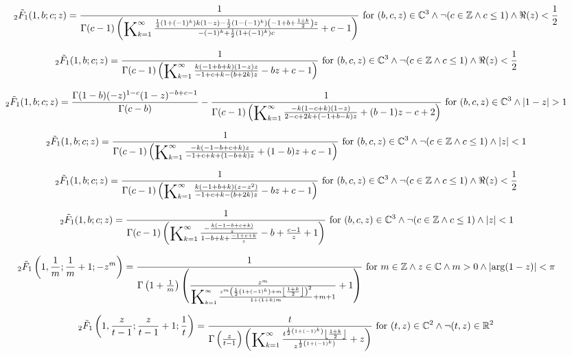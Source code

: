 \documentclass{article}
\newcommand{\bigK}{\mathop{\raisebox{-5pt}{\huge K}}}
\begin{document}
\[\, _2\tilde{F}_1(1,b;c;z)=\frac{1}{\Gamma (c-1) \left(\bigK_{k=1}^{\infty}\frac{\frac{1}{4} \left(1+(-1)^k\right) k (1-z)-\frac{1}{2} \left(1-(-1)^k\right) \left(-1+b+\frac{1+k}{2}\right) z}{-(-1)^k+\frac{1}{2} \left(1+(-1)^k\right) c}+c-1\right)}\text{ for }(b,c,z)\in \mathbb{C}^3\land \neg (c\in \mathbb{Z}\land c\leq 1)\land \Re(z)<\frac{1}{2}\] 

\[\, _2\tilde{F}_1(1,b;c;z)=\frac{1}{\Gamma (c-1) \left(\bigK_{k=1}^{\infty}\frac{k (-1+b+k) (1-z) z}{-1+c+k-(b+2 k) z}-b z+c-1\right)}\text{ for }(b,c,z)\in \mathbb{C}^3\land \neg (c\in \mathbb{Z}\land c\leq 1)\land \Re(z)<\frac{1}{2}\] 

\[\, _2\tilde{F}_1(1,b;c;z)=\frac{\Gamma (1-b) (-z)^{1-c} (1-z)^{-b+c-1}}{\Gamma (c-b)}-\frac{1}{\Gamma (c-1) \left(\bigK_{k=1}^{\infty}\frac{-k (1-c+k) (1-z)}{2-c+2 k+(-1+b-k) z}+(b-1) z-c+2\right)}\text{ for }(b,c,z)\in \mathbb{C}^3\land \left| 1-z\right| >1\] 

\[\, _2\tilde{F}_1(1,b;c;z)=\frac{1}{\Gamma (c-1) \left(\bigK_{k=1}^{\infty}\frac{-k (-1-b+c+k) z}{-1+c+k+(1-b+k) z}+(1-b) z+c-1\right)}\text{ for }(b,c,z)\in \mathbb{C}^3\land \neg (c\in \mathbb{Z}\land c\leq 1)\land \left| z\right| <1\] 

\[\, _2\tilde{F}_1(1,b;c;z)=\frac{1}{\Gamma (c-1) \left(\bigK_{k=1}^{\infty}\frac{k (-1+b+k) \left(z-z^2\right)}{-1+c+k-(b+2 k) z}-b z+c-1\right)}\text{ for }(b,c,z)\in \mathbb{C}^3\land \neg (c\in \mathbb{Z}\land c\leq 1)\land \Re(z)<\frac{1}{2}\] 

\[\, _2\tilde{F}_1(1,b;c;z)=\frac{1}{\Gamma (c-1) \left(\bigK_{k=1}^{\infty}\frac{-\frac{k (-1-b+c+k)}{z}}{1-b+k+\frac{-1+c+k}{z}}-b+\frac{c-1}{z}+1\right)}\text{ for }(b,c,z)\in \mathbb{C}^3\land \neg (c\in \mathbb{Z}\land c\leq 1)\land \left| z\right| <1\] 

\[\, _2\tilde{F}_1\left(1,\frac{1}{m};\frac{1}{m}+1;-z^m\right)=\frac{1}{\Gamma \left(1+\frac{1}{m}\right) \left(\frac{z^m}{\bigK_{k=1}^{\infty}\frac{z^m \left(\frac{1}{2} \left(1+(-1)^k\right)+m \left\lfloor \frac{1+k}{2}\right\rfloor \right)^2}{1+(1+k) m}+m+1}+1\right)}\text{ for }m\in \mathbb{Z}\land z\in \mathbb{C}\land m>0\land \left| \arg (1-z)\right| <\pi\] 

\[\, _2\tilde{F}_1\left(1,\frac{z}{t-1};\frac{z}{t-1}+1;\frac{1}{t}\right)=\frac{t}{\Gamma \left(\frac{z}{t-1}\right) \left(\bigK_{k=1}^{\infty}\frac{t^{\frac{1}{2} \left(1+(-1)^k\right)} \left\lfloor \frac{1+k}{2}\right\rfloor }{z^{\frac{1}{2} \left(1+(-1)^k\right)}}+z\right)}\text{ for }(t,z)\in \mathbb{C}^2\land \neg (t,z)\in \mathbb{R}^2\] 
\end{document}
